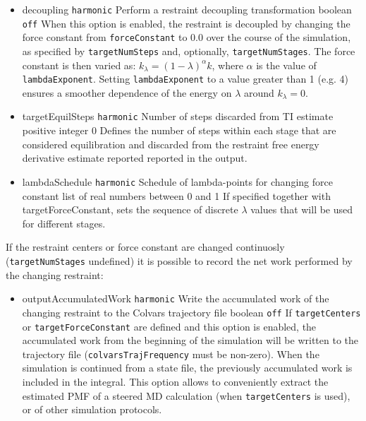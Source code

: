 \begin{itemize}
    \item %
    \keydef
    {decoupling}{%
      \texttt{harmonic}}{%
      Perform a restraint decoupling transformation}{%
      boolean}{%
    \texttt{off}}{%
    When this option is enabled, the restraint is decoupled by changing the force constant
    from \texttt{forceConstant} to 0.0 over the course of the simulation, as specified
    by \texttt{targetNumSteps} and, optionally, \texttt{targetNumStages}.
    The force constant is then varied as:
    $ k_\lambda = (1 - \lambda)^\alpha k$,
    where $\alpha$ is the value of \texttt{lambdaExponent}.
    Setting \texttt{lambdaExponent} to a value greater than 1 (e.g. 4) ensures a smoother
    dependence of the energy on $\lambda$ around $k_\lambda = 0$.}

\item %
  \keydef
    {targetEquilSteps}{%
    \texttt{harmonic}}{%
    Number of steps discarded from TI estimate}{%
    positive integer}{%
    0}{%
    Defines the number of steps within each stage that are considered
    equilibration and discarded from the restraint free energy derivative
    estimate reported reported in the output.}

\item %
  \key
    {lambdaSchedule}{%
    \texttt{harmonic}}{%
    Schedule of lambda-points for changing force constant}{%
    list of real numbers between 0 and 1}{%
    If specified together with targetForceConstant, sets the sequence of
    discrete $\lambda$ values that will be used for different stages.
  }

\end{itemize}



If the restraint centers or force constant are changed continuosly (\texttt{targetNumStages} undefined) it is possible to record the net work performed by the changing restraint:
\begin{itemize}
\item %
  \keydef
    {outputAccumulatedWork}{%
    \texttt{harmonic}}{%
    Write the accumulated work of the changing restraint to the Colvars trajectory file}{%
    boolean}{%
    \texttt{off}}{%
    If \texttt{targetCenters} or \texttt{targetForceConstant} are defined and this option is enabled, the accumulated work from the beginning of the simulation will be written to the trajectory file (\texttt{colvarsTrajFrequency} must be non-zero).
    When the simulation is continued from a state file, the previously accumulated work is included in the integral.
    This option allows to conveniently extract the estimated PMF of a steered MD calculation (when \texttt{targetCenters} is used), or of other simulation protocols.
}
\end{itemize}


